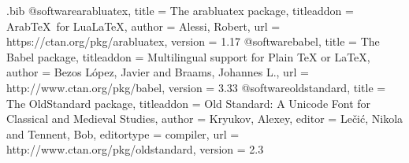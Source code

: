 \RequirePackage{filecontents}
\begin{filecontents*}{\jobname.bib}
@software{arabluatex,
  title =	 {The arabluatex package},
  titleaddon =	 {Arab\TeX\ for Lua\LaTeX},
  author =	 {Alessi, Robert},
  url =		 {https://ctan.org/pkg/arabluatex},
  version =	 {1.17}
}
@software{babel,
  title =	 {The Babel package},
  titleaddon =	 {Multilingual support for Plain TeX or LaTeX},
  author =	 {Bezos López, Javier and Braams, Johannes L.},
  url =		 {http://www.ctan.org/pkg/babel},
  version =	 {3.33}
}
@software{oldstandard,
  title =	 {The OldStandard package},
  titleaddon =	 {Old Standard: A Unicode Font for Classical and
                  Medieval Studies},
  author =	 {Kryukov, Alexey},
  editor =	 {Lečić, Nikola and Tennent, Bob},
  editortype =	 {compiler},
  url =		 {http://www.ctan.org/pkg/oldstandard},
  version =	 {2.3}
}
\end{filecontents*}
\documentclass[letterpaper]{article}
\usepackage{fontspec}
\usepackage{microtype}
\usepackage[default]{fontsetup}
\usepackage[greek.ancient,english]{babel}

[RawFeature=onum]{Old Standard}
[RawFeature={onum;ss06}]{Old Standard}

\usepackage[parfill]{parskip}
\newlength{}
\setlength{}
\usepackage{dtxdescribe}
\setlength\parindent{\defaultparindent}

\usepackage[xindy]{imakeidx}
\makeindex

\usepackage{latexcolors}
\usepackage{csquotes}
\usepackage{varioref}
\usepackage{hyperref}
\usepackage{xurl}
\usepackage{uri}

\usepackage{enumitem}
\usepackage{metalogox}
\usepackage{lettrine}
\usepackage{setspace}

\usepackage{relsize}
\usepackage{tikz}
\usepackage[breakable, skins, xparse, minted]{tcolorbox}


